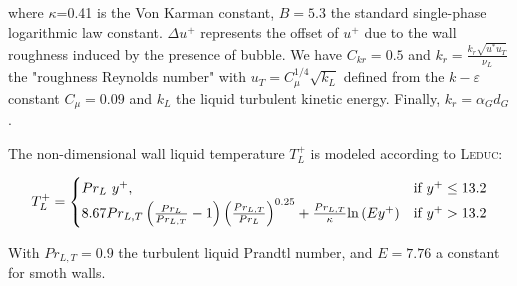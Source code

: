 where $\kappa$=0.41 is the Von Karman constant, $B=5.3$ the standard single-phase logarithmic law constant. $\Delta u^{+}$ represents the offset of $u^{+}$ due to the wall roughness induced by the presence of bubble. We have $C_{kr}=0.5$ and $k_{r}=\displaystyle \frac{k_{r}\sqrt{u^{*}u_{T}}}{\nu_{L}}$ the "roughness Reynolds number" with $u_{T}=C_{\mu}^{1/4}\sqrt{k_{L}}$ defined from the $k-\varepsilon$ constant $C_{\mu}=0.09$ and $k_{L}$ the liquid turbulent kinetic energy. Finally, $k_{r}=\alpha_{G}d_{G}$.

The non-dimensional wall liquid temperature $T_{L}^{+}$ is modeled according to \textsc{Leduc}\cite{leduc1995}:

\begin{equation}
\label{eq:wall_law} 
  T_{L}^{+}=\begin{cases}
    Pr_{L}~y^{+}, & \text{if $y^{+}\leq 13.2$}\\
    8.67Pr_{L,T}\left(  \frac{Pr_{L}}{Pr_{L,T}}-1  \right) \left( \frac{Pr_{L,T}}{Pr_{L}}  \right)^{0.25} + \frac{Pr_{L,T}}{\kappa}\mathrm{ln}\left( Ey^{+} \right)  & \text{\text{if $y^{+}>13.2$}}
  \end{cases}
\end{equation}

With $Pr_{L,T}=0.9$ the turbulent liquid Prandtl number, and $E=7.76$ a constant for smoth walls.